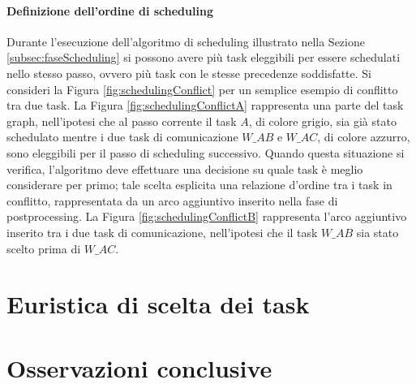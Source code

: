 \paragraph{Definizione dell'ordine di scheduling}
Durante l'esecuzione dell'algoritmo di scheduling illustrato nella Sezione 
\ref{subsec:faseScheduling} si possono avere più task eleggibili per essere 
schedulati nello stesso passo, ovvero più task con le stesse precedenze 
soddisfatte. Si consideri la Figura \ref{fig:schedulingConflict} per un 
semplice esempio di conflitto tra due task. La Figura 
\ref{fig:schedulingConflictA} rappresenta una parte del task graph, 
nell'ipotesi che al passo corrente il task $A$, di colore grigio, sia già stato 
schedulato mentre i due task di comunicazione $W\_AB$ e $W\_AC$, di colore 
azzurro, sono eleggibili per il passo di scheduling successivo. Quando questa
situazione si verifica, l'algoritmo deve effettuare una decisione su quale 
task è meglio considerare per primo; tale scelta esplicita una relazione 
d'ordine tra i task in conflitto, rappresentata da un arco aggiuntivo inserito 
nella fase di postprocessing. La Figura \ref{fig:schedulingConflictB} 
rappresenta l'arco aggiuntivo inserito tra i due task di comunicazione, 
nell'ipotesi che il task $W\_AB$ sia stato scelto prima di $W\_AC$.


\section{Euristica di scelta dei task}
\label{sec:euristicaSceltaTask}


\section{Osservazioni conclusive}
\label{sec:osservazioniConclusive}
